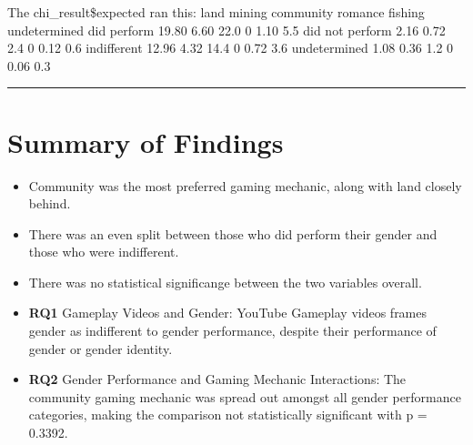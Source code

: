 \documentclass[
  12pt,
  letterpaper,
  DIV=11,
  numbers=noendperiod]{scrreprt}
\providecommand{\tightlist}{%
  \setlength{\itemsep}{0pt}\setlength{\parskip}{0pt}}
\begin{document}
The chi\_result\$expected ran this: land mining community romance
fishing undetermined did perform 19.80 6.60 22.0 0 1.10 5.5 did not
perform 2.16 0.72 2.4 0 0.12 0.6 indifferent 12.96 4.32 14.4 0 0.72 3.6
undetermined 1.08 0.36 1.2 0 0.06 0.3

\begin{center}\rule{0.5\linewidth}{0.5pt}\end{center}

\section{Summary of Findings}\label{summary-of-findings}

\begin{itemize}
\tightlist
\item
  Community was the most preferred gaming mechanic, along with land
  closely behind.
\item
  There was an even split between those who did perform their gender and
  those who were indifferent.
\item
  There was no statistical significange between the two variables
  overall.
\end{itemize}

\begin{tcolorbox}[enhanced jigsaw, arc=.35mm, bottomrule=.15mm, bottomtitle=1mm, breakable, colback=white, colbacktitle=quarto-callout-note-color!10!white, colframe=quarto-callout-note-color-frame, coltitle=black, left=2mm, leftrule=.75mm, opacityback=0, opacitybacktitle=0.6, rightrule=.15mm, title=\textcolor{quarto-callout-note-color}{\faInfo}\hspace{0.5em}{Key Findings at a Glance}, titlerule=0mm, toprule=.15mm, toptitle=1mm]

\begin{itemize}
\item
  \textbf{RQ1} Gameplay Videos and Gender: YouTube Gameplay videos
  frames gender as indifferent to gender performance, despite their
  performance of gender or gender identity.
\item
  \textbf{RQ2} Gender Performance and Gaming Mechanic Interactions: The
  community gaming mechanic was spread out amongst all gender
  performance categories, making the comparison not statistically
  significant with p = 0.3392.
\end{itemize}

\end{tcolorbox}

\end{document}
